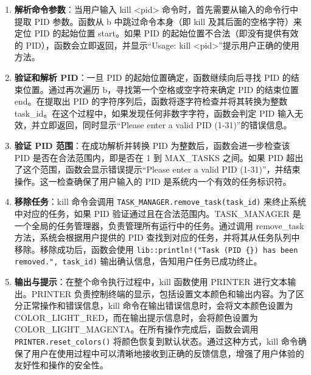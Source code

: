 \begin{enumerate}
    \item \textbf{解析命令参数}：当用户输入 kill <pid> 命令时，首先需要从输入的命令行中提取 PID 参数。函数从 b 中跳过命令本身（即 kill 及其后面的空格字符）来定位 PID 的起始位置 start。如果 PID 的起始位置不合法（即没有提供有效的 PID），函数会立即返回，并显示“Usage: kill <pid>”提示用户正确的使用方法。
    \item \textbf{验证和解析 PID}：一旦 PID 的起始位置确定，函数继续向后寻找 PID 的结束位置。通过再次遍历 b，寻找第一个空格或空字符来确定 PID 的结束位置 end。在提取出 PID 的字符序列后，函数将逐字符检查并将其转换为整数 task\_id。在这个过程中，如果发现任何非数字字符，函数会判定 PID 输入无效，并立即返回，同时显示“Please enter a valid PID (1-31)”的错误信息。
    \item \textbf{验证 PID 范围}：在成功解析并转换 PID 为整数后，函数会进一步检查该 PID 是否在合法范围内，即是否在 1 到 MAX\_TASKS 之间。如果 PID 超出了这个范围，函数会显示错误提示“Please enter a valid PID (1-31)”，并结束操作。这一检查确保了用户输入的 PID 是系统内一个有效的任务标识符。
    \item \textbf{移除任务}：kill 命令会调用 \texttt{TASK\_MANAGER.remove\_task(task\_id)} 来终止系统中对应的任务，如果 PID 验证通过且在合法范围内。TASK\_MANAGER 是一个全局的任务管理器，负责管理所有运行中的任务。通过调用 remove\_task 方法，系统会根据用户提供的 PID 查找到对应的任务，并将其从任务队列中移除。移除成功后，函数会使用 \texttt{lib::println!("Task (PID \{\}) has been removed.", task\_id)} 输出确认信息，告知用户任务已成功终止。
    \item \textbf{输出与提示}：在整个命令执行过程中，kill 函数使用 PRINTER 进行文本输出。PRINTER 负责控制终端的显示，包括设置文本颜色和输出内容。为了区分正常操作和错误信息，kill 命令在输出错误信息时，会将文本颜色设置为 COLOR\_LIGHT\_RED，而在输出提示信息时，会将颜色设置为 COLOR\_LIGHT\_MAGENTA。在所有操作完成后，函数会调用 \texttt{PRINTER.reset\_colors()} 将颜色恢复到默认状态。通过这种方式，kill 命令确保了用户在使用过程中可以清晰地接收到正确的反馈信息，增强了用户体验的友好性和操作的安全性。
\end{enumerate}

